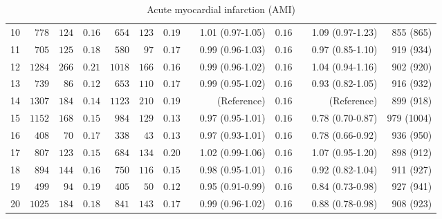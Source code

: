 \documentclass[]{article}\usepackage[]{graphicx}\usepackage[]{color}
\begin{document}
\begin{landscape}
\begin{table}[!tbp]
\begin{center}
\begin{tabular}{lrrrrrrcrrcrr}
10&$ 778$&$124$&$0.16$&$ 654$&$123$&$0.19$&&1.01 (0.97-1.05)&$0.16$&&1.09 (0.97-1.23)&855 (865)\tabularnewline
11&$ 705$&$125$&$0.18$&$ 580$&$ 97$&$0.17$&&0.99 (0.96-1.03)&$0.16$&&0.97 (0.85-1.10)&919 (934)\tabularnewline
12&$1284$&$266$&$0.21$&$1018$&$166$&$0.16$&&0.99 (0.96-1.02)&$0.16$&&1.04 (0.94-1.16)&902 (920)\tabularnewline
13&$ 739$&$ 86$&$0.12$&$ 653$&$110$&$0.17$&&0.99 (0.95-1.02)&$0.16$&&0.93 (0.82-1.05)&916 (932)\tabularnewline
14&$1307$&$184$&$0.14$&$1123$&$210$&$0.19$&&(Reference)&$0.16$&&(Reference)&899 (918)\tabularnewline
15&$1152$&$168$&$0.15$&$ 984$&$129$&$0.13$&&0.97 (0.95-1.01)&$0.16$&&0.78 (0.70-0.87)&979 (1004)\tabularnewline
16&$ 408$&$ 70$&$0.17$&$ 338$&$ 43$&$0.13$&&0.97 (0.93-1.01)&$0.16$&&0.78 (0.66-0.92)&936 (950)\tabularnewline
17&$ 807$&$123$&$0.15$&$ 684$&$134$&$0.20$&&1.02 (0.99-1.06)&$0.16$&&1.07 (0.95-1.20)&898 (912)\tabularnewline
18&$ 894$&$144$&$0.16$&$ 750$&$116$&$0.15$&&0.98 (0.95-1.01)&$0.16$&&0.92 (0.82-1.04)&911 (927)\tabularnewline
19&$ 499$&$ 94$&$0.19$&$ 405$&$ 50$&$0.12$&&0.95 (0.91-0.99)&$0.16$&&0.84 (0.73-0.98)&927 (941)\tabularnewline
20&$1025$&$184$&$0.18$&$ 841$&$143$&$0.17$&&0.99 (0.96-1.02)&$0.16$&&0.88 (0.78-0.98)&908 (923)\tabularnewline
\hline
\end{tabular}

\caption{Acute myocardial infarction (AMI)\label{ami_table}}\end{center}


\end{table}
\end{landscape}
\end{document}
